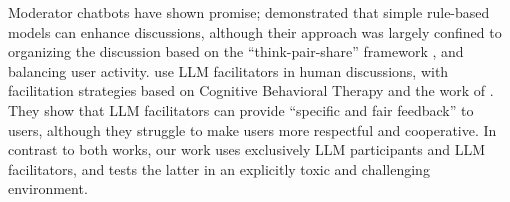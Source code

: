 Moderator chatbots have shown promise; \citet{kim_et_al_chatbot} demonstrated that simple rule-based models can enhance discussions, although their approach was largely confined to organizing the discussion based on the ``think-pair-share'' framework \cite{ahmad_2010_supporting, Navajas2018}, and balancing user activity. \citet{cho-etal-2024-language} use \ac{LLM} facilitators in human discussions, with facilitation strategies based on Cognitive Behavioral Therapy and the work of \citet{rosenberg2015nonviolent}. They show that \ac{LLM} facilitators can provide “specific and fair feedback” to users, although they struggle to make users more respectful and cooperative.  In contrast to both works, our work uses exclusively \ac{LLM} participants and \ac{LLM} facilitators, and tests the latter in an explicitly toxic and challenging environment.